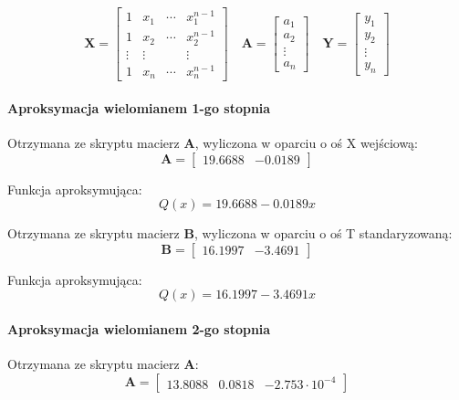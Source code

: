 \documentclass[a4paper, 12pt]{mwart}
\begin{document}
				$$ \textbf{X} = \begin{bmatrix}
					1      & x_1    & \cdots & x_1^{n-1} \\
					1      & x_2    & \cdots & x_2^{n-1} \\
					\vdots & \vdots &        & \vdots\\ 
					1      & x_n    & \cdots & x_n^{n-1}
				\end{bmatrix} 
				\quad 
				\textbf{A} = \begin{bmatrix}
					a_1\\
					a_2\\
					\vdots\\
					a_n
				\end{bmatrix} \quad
				\textbf{Y} = \begin{bmatrix}
					y_1\\
					y_2\\
					\vdots\\
					y_n
				\end{bmatrix}$$

				\paragraph{Aproksymacja wielomianem 1-go stopnia}

					Otrzymana ze skryptu macierz $\textbf{A}$, wyliczona w oparciu o oś X wejściową:
					$$ \textbf{A} = \begin{bmatrix}
						19.6688 &
						-0.0189
					\end{bmatrix} $$

					Funkcja aproksymująca:
					$$ Q(x) = 19.6688 -0.0189x $$

					Otrzymana ze skryptu macierz $\textbf{B}$, wyliczona w oparciu o
					oś T standaryzowaną:
					$$ \textbf{B} = \begin{bmatrix}
						16.1997 &
						-3.4691
					\end{bmatrix} $$

					Funkcja aproksymująca:
					$$ Q(x) = 16.1997 -3.4691x$$

				\paragraph{Aproksymacja wielomianem 2-go stopnia}

					Otrzymana ze skryptu macierz $\textbf{A}$:
					$$\textbf{A} = \begin{bmatrix}
						13.8088 &
						0.0818 &
						-2.753 \cdot 10^{-4}
					\end{bmatrix}$$
					
\end{document}
